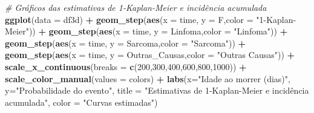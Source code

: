 \documentclass[]{article}
\newenvironment{Shaded}{\begin{snugshade}}{\end{snugshade}}
\newcommand{\KeywordTok}[1]{\textcolor[rgb]{0.13,0.29,0.53}{\textbf{#1}}}
\newcommand{\DataTypeTok}[1]{\textcolor[rgb]{0.13,0.29,0.53}{#1}}
\newcommand{\DecValTok}[1]{\textcolor[rgb]{0.00,0.00,0.81}{#1}}
\newcommand{\StringTok}[1]{\textcolor[rgb]{0.31,0.60,0.02}{#1}}
\newcommand{\CommentTok}[1]{\textcolor[rgb]{0.56,0.35,0.01}{\textit{#1}}}
\newcommand{\OperatorTok}[1]{\textcolor[rgb]{0.81,0.36,0.00}{\textbf{#1}}}
\newcommand{\NormalTok}[1]{#1}
\begin{document}
\begin{Shaded}
\begin{Highlighting}[]
\CommentTok{# Gráficos das estimativas de 1-Kaplan-Meier e incidência acumulada}
\KeywordTok{ggplot}\NormalTok{(}\DataTypeTok{data =}\NormalTok{ df3d) }\OperatorTok{+}\StringTok{  }
\StringTok{  }\KeywordTok{geom_step}\NormalTok{(}\KeywordTok{aes}\NormalTok{(}\DataTypeTok{x =}\NormalTok{ time, }\DataTypeTok{y =}\NormalTok{ F,}\DataTypeTok{color =} \StringTok{"1-Kaplan-Meier"}\NormalTok{)) }\OperatorTok{+}
\StringTok{  }\KeywordTok{geom_step}\NormalTok{(}\KeywordTok{aes}\NormalTok{(}\DataTypeTok{x =}\NormalTok{ time, }\DataTypeTok{y =}\NormalTok{ Linfoma,}\DataTypeTok{color =} \StringTok{"Linfoma"}\NormalTok{)) }\OperatorTok{+}
\StringTok{  }\KeywordTok{geom_step}\NormalTok{(}\KeywordTok{aes}\NormalTok{(}\DataTypeTok{x =}\NormalTok{ time, }\DataTypeTok{y =}\NormalTok{ Sarcoma,}\DataTypeTok{color =} \StringTok{"Sarcoma"}\NormalTok{)) }\OperatorTok{+}
\StringTok{  }\KeywordTok{geom_step}\NormalTok{(}\KeywordTok{aes}\NormalTok{(}\DataTypeTok{x =}\NormalTok{ time, }\DataTypeTok{y =}\NormalTok{ Outras_Causas,}\DataTypeTok{color =} \StringTok{"Outras Causas"}\NormalTok{)) }\OperatorTok{+}
\StringTok{  }\KeywordTok{scale_x_continuous}\NormalTok{(}\DataTypeTok{breaks =} \KeywordTok{c}\NormalTok{(}\DecValTok{200}\NormalTok{,}\DecValTok{300}\NormalTok{,}\DecValTok{400}\NormalTok{,}\DecValTok{600}\NormalTok{,}\DecValTok{800}\NormalTok{,}\DecValTok{1000}\NormalTok{)) }\OperatorTok{+}
\StringTok{  }\KeywordTok{scale_color_manual}\NormalTok{(}\DataTypeTok{values =}\NormalTok{ colors) }\OperatorTok{+}
\StringTok{  }\KeywordTok{labs}\NormalTok{(}\DataTypeTok{x=}\StringTok{"Idade ao morrer (dias)"}\NormalTok{,}
       \DataTypeTok{y=}\StringTok{"Probabilidade do evento"}\NormalTok{,}
       \DataTypeTok{title =} \StringTok{"Estimativas de 1-Kaplan-Meier e incidência acumulada"}\NormalTok{,}
       \DataTypeTok{color =} \StringTok{"Curvas estimadas"}\NormalTok{) }
\end{Highlighting}
\end{Shaded}
\end{document}
